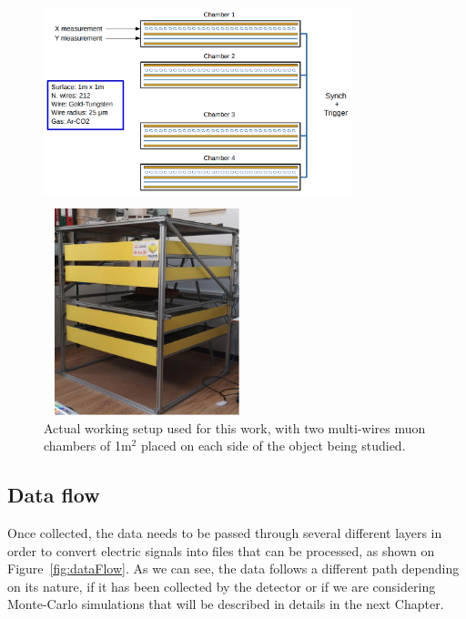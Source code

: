 \documentclass[a4paper, 11pt]{report}
\begin{document}
\begin{figure}[htbp]
\centering
\begin{minipage}[b]{.59\textwidth}
\includegraphics[width=9cm, height=6cm]{figs/muonChambers.png}
\end{minipage}\hfill
\begin{minipage}[b]{.39\textwidth}
\includegraphics[width=6cm, height=6cm]{figs/muonChambersPhoto.png}
\end{minipage} \hfill
\caption{Actual working setup used for this work, with two multi-wires muon chambers of 1m$^2$ placed on each side of the object being studied.}
\label{fig:setup}
\end{figure}

\subsection{Data flow} \label{sec:dataFlow}

Once collected, the data needs to be passed through several different layers in order to convert electric signals into files that can be processed, as shown on Figure~\ref{fig:dataFlow}. As we can see, the data follows a different path depending on its nature, if it has been collected by the detector or if we are considering Monte-Carlo simulations that will be described in details in the next Chapter. 
\end{document}
